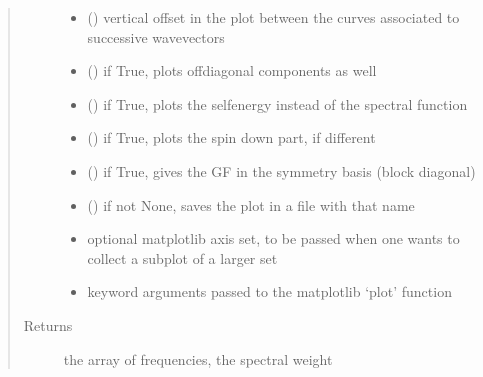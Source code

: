 \documentclass[letterpaper,10pt,english]{sphinxmanual}
\begin{document}
\begin{fulllineitems}
\begin{quote}
\begin{description}
\begin{itemize}
\item {} 
\sphinxAtStartPar
{} () \textendash{} vertical offset in the plot between the curves associated to successive wavevectors

\item {} 
\sphinxAtStartPar
{} () \textendash{} if True, plots off\sphinxhyphen{}diagonal components as well

\item {} 
\sphinxAtStartPar
{} () \textendash{} if True, plots the self\sphinxhyphen{}energy instead of the spectral function

\item {} 
\sphinxAtStartPar
{} () \textendash{} if True, plots the spin down part, if different

\item {} 
\sphinxAtStartPar
{} () \textendash{} if True, gives the GF in the symmetry basis (block diagonal)

\item {} 
\sphinxAtStartPar
{} () \textendash{} if not None, saves the plot in a file with that name

\item {} 
\sphinxAtStartPar
{} \textendash{} optional matplotlib axis set, to be passed when one wants to collect a subplot of a larger set

\item {} 
\sphinxAtStartPar
{} \textendash{} keyword arguments passed to the matplotlib ‘plot’ function

\end{itemize}

\item[{Returns}] \leavevmode
\sphinxAtStartPar
the array of frequencies, the spectral weight

\end{description}\end{quote}

\end{fulllineitems}
\end{document}
